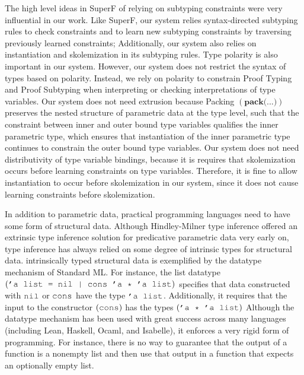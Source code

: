 \documentclass[acmsmall]{acmart}
\theoremstyle{definition}
\begin{document}
The high level ideas in SuperF of relying on subtyping constraints were very influential in our work.
Like SuperF, our system relies syntax-directed subtyping rules to check constraints and to learn 
new subtyping constraints by traversing previously learned constraints;
Additionally, our system also relies on instantiation and skolemization in its subtyping rules. 
Type polarity is also important in our system.
However, our system does not restrict the syntax of types based on polarity. Instead, we rely on
polarity to constrain Proof Typing and Proof Subtyping when interpreting or checking interpretations
of type variables.    
Our system does not need extrusion because Packing $(\textbf{pack(...)})$ preserves the nested structure of 
parametric data at the type level, such that the constraint between inner and outer bound type variables
qualifies the inner parametric type, which ensures that instantiation of the inner parametric type 
continues to constrain the outer bound type variables.  
Our system does not need distributivity of type variable bindings, because it is requires
that skolemization occurs before learning constraints on type variables. Therefore, it is fine to allow
instantiation to occur before skolemization in our system, 
since it does not cause learning constraints before skolemization.  


In addition to parametric data, practical programming languages need to have some form of structural data.
Although Hindley-Milner type inference offered an extrinsic type inference solution for predicative parametric data
very early on, type inference has always relied on some degree of intrinsic types for structural data.
intrinsically typed structural data is exemplified by the datatype mechanism of Standard ML.
For instance, the list datatype $(\J{'a list = nil | cons 'a * 'a list})$ specifies that 
data constructed with ${\J{nil}}$ or $\J{cons}$ have the type ${\J{'a list}}$. Additionally,
it requires that the input to the constructor $(\J{cons})$  has the types $(\J{'a * 'a list})$
Although the datatype mechanism has been used with great success across many languages (including Lean, Haskell, Ocaml, and Isabelle),
it enforces a very rigid form of programming. For instance, there is no way to guarantee
that the output of a function is a nonempty list and then use that output in a function that expects an optionally empty list.
\end{document}
